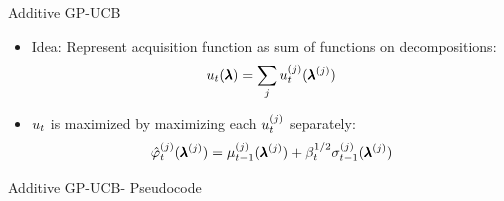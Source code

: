 \begin{frame}{Additive GP-UCB}
\begin{itemize}

    \item Idea: Represent acquisition function as sum of functions on decompositions:
    \pause
    \begin{equation*}
        u_{t}(\pmb{\lambda}) = \sum_{j}u_{t}^{(j)}(\pmb{\lambda}^{(j)})
    \end{equation*}
    \pause
    \item $u_{t}$ is maximized by maximizing each $u_{t}^{(j)}$ separately:
    \pause
    \begin{equation*}
        \hat{\varphi}_{t}^{(j)}(\pmb{\lambda}^{(j)}) = \mu_{t-1}^{(j)}(\pmb{\lambda}^{(j)}) + \beta_{t}^{1/2}\sigma_{t-1}^{(j)}(\pmb{\lambda}^{(j)})
    \end{equation*}
\end{itemize}
\end{frame}



\begin{frame}{Additive GP-UCB- Pseudocode}
\begin{algorithm}[H]
    \LinesNumbered
    \SetAlgoLined
    \setcounter{AlgoLine}{0}
    
    \caption{Add-GP-UCB}
\end{algorithm}
\end{frame}


